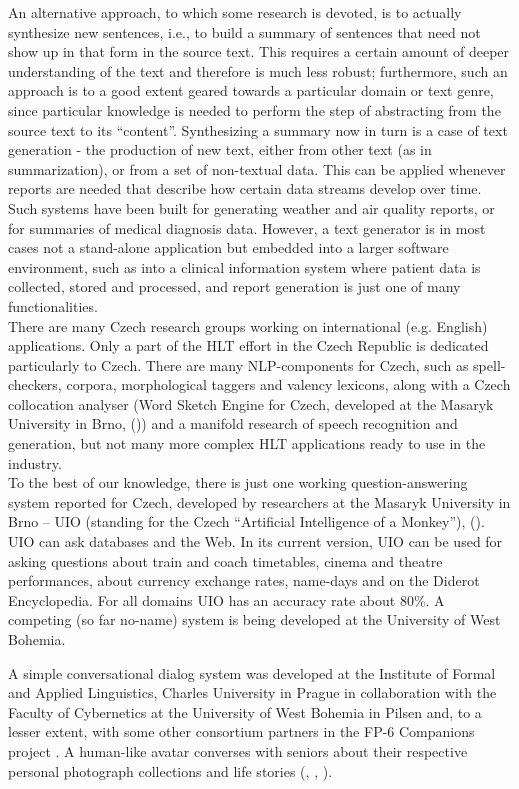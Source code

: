 \begin{multicols}{2}
An alternative approach, to which some research is devoted, is to actually synthesize new sentences, i.e., to build a summary of sentences that need not show up in that form in the source text. This requires a certain amount of deeper understanding of the text and therefore is much less robust; furthermore, such an approach is to a good extent geared towards a particular domain or text genre, since particular knowledge is needed to perform the step of abstracting from the source text to its “content”. Synthesizing a summary now in turn is a case of text generation - the production of new text, either from other text (as in summarization), or from a set of non-textual data. This can be applied whenever reports are needed that describe how certain data streams develop over time. Such systems have been built for generating weather and air quality reports, or for summaries of medical diagnosis data. However, a text generator is in most cases not a stand-alone application but embedded into a larger software environment, such as into a clinical information system where patient data is collected, stored and processed, and report generation is just one of many functionalities.\\
There are many Czech research groups working on international (e.g. English) applications. Only a part of the HLT effort in the Czech Republic is dedicated particularly to Czech. There are many NLP-components for Czech, such as spell-checkers, corpora, morphological taggers and valency lexicons, along with a Czech collocation analyser (Word Sketch Engine for Czech, developed at the Masaryk University in Brno, (\cite{Horak2009})) and a manifold research of speech recognition and generation, but not many more complex HLT applications ready to use in the industry.\\
To the best of our knowledge, there is just one working question-answering system reported for Czech, developed by researchers at the Masaryk University in Brno – UIO (standing for the Czech “Artificial Intelligence of a Monkey”), (\cite{Svoboda2003}). UIO can ask databases and the Web. In its current version, UIO can be used for asking questions about train and coach timetables, cinema and theatre performances, about currency exchange rates, name-days and on the Diderot Encyclopedia. For all domains UIO has an accuracy rate about 80\%. A competing (so far no-name) system is being developed at the University of West Bohemia.

A simple conversational dialog system was developed at the Institute of Formal and Applied Linguistics, Charles University in Prague in collaboration with the Faculty of Cybernetics at the University of West Bohemia in Pilsen and, to a lesser extent, with some other consortium partners in the FP-6 Companions project \cite{Note21}. A human-like avatar converses with seniors about their respective personal photograph collections and life stories (\cite{Ptacek2010}, \cite{Romportl2010}, \cite{GruberTihelka2010}).


\end{multicols}
